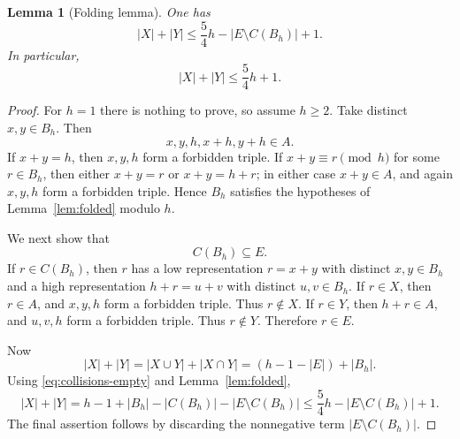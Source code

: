 \documentclass[10pt,a4paper]{amsart}
\newtheorem{lemma}[theorem]{Lemma}
\begin{document}
\begin{lemma}[Folding lemma]\label{lem:folding}
One has
\[
  |X|+|Y|\leq \frac54h-|E\setminus C(B_h)|+1.
\]
In particular,
\[
  |X|+|Y|\leq \frac54h+1.
\]
\end{lemma}

\begin{proof}
For $h=1$ there is nothing to prove, so assume $h\geq 2$. Take distinct $x,y\in B_h$. Then
\[
  x,y,h,x+h,y+h\in A.
\]
If $x+y=h$, then $x,y,h$ form a forbidden triple. If $x+y\equiv r\pmod h$ for some $r\in B_h$, then either $x+y=r$ or $x+y=h+r$; in either case $x+y\in A$, and again $x,y,h$ form a forbidden triple. Hence $B_h$ satisfies the hypotheses of Lemma~\ref{lem:folded} modulo $h$.

We next show that
\begin{equation}\label{eq:collisions-empty}
  C(B_h)\subseteq E.
\end{equation}
If $r\in C(B_h)$, then $r$ has a low representation $r=x+y$ with distinct $x,y\in B_h$ and a high representation $h+r=u+v$ with distinct $u,v\in B_h$. If $r\in X$, then $r\in A$, and $x,y,h$ form a forbidden triple. Thus $r\notin X$. If $r\in Y$, then $h+r\in A$, and $u,v,h$ form a forbidden triple. Thus $r\notin Y$. Therefore $r\in E$.

Now
\[
  |X|+|Y|=|X\cup Y|+|X\cap Y|=(h-1-|E|)+|B_h|.
\]
Using \eqref{eq:collisions-empty} and Lemma~\ref{lem:folded},
\[
  |X|+|Y|=h-1+|B_h|-|C(B_h)|-|E\setminus C(B_h)|
  \leq \frac54h-|E\setminus C(B_h)|+1.
\]
The final assertion follows by discarding the nonnegative term $|E\setminus C(B_h)|$.
\end{proof}
\end{document}
